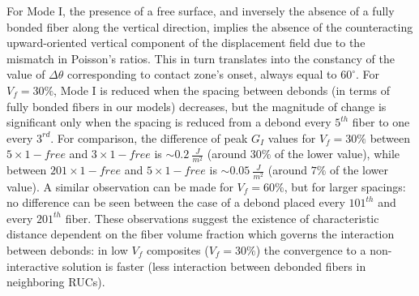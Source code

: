 \documentclass[review]{elsarticle}
\begin{document}
For Mode I, the presence of a free surface, and inversely the absence of a fully bonded fiber along the vertical direction, implies the absence of the counteracting upward-oriented vertical component of the displacement field due to the mismatch in Poisson's ratios. This in turn translates into the constancy of the value of $\Delta\theta$ corresponding to contact zone's onset, always equal to $60^{\circ}$. For $V_{f}=30\%$, Mode I is reduced when the spacing between debonds (in terms of fully bonded fibers in our models) decreases, but the magnitude of change is significant only when the spacing is reduced from a debond every $5^{th}$ fiber to one every $3^{rd}$. For comparison, the difference of peak $G_{I}$ values for $V_{f}=30\%$ between $5\times 1-free$ and $3\times 1-free$ is $\sim 0.2\ \frac{J}{m^{2}}$ (around $30\%$ of the lower value), while between $201\times 1-free$ and $5\times 1-free$ is $\sim 0.05\ \frac{J}{m^{2}}$ (around $7\%$ of the lower value). A similar observation can be made for $V_{f}=60\%$, but for larger spacings: no difference can be seen between the case of a debond placed every $101^{th}$ and every $201^{th}$ fiber. These observations suggest the existence of characteristic distance dependent on the fiber volume fraction which governs the interaction between debonds: in low $V_{f}$ composites ($V_{f}=30\%$) the convergence to a non-interactive solution is faster (less interaction between debonded fibers in neighboring RUCs).
\end{document}
